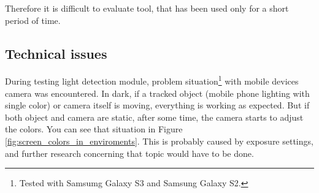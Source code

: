Therefore it is difficult to evaluate tool, that has been used only for a short period of time.

\subsection{Technical issues}
During testing light detection module, problem situation\footnote{Tested with Samsumg Galaxy S3 and Samsung Galaxy S2.} with mobile devices camera was encountered.
In dark, if a tracked object (mobile phone lighting with single color) or camera itself is moving, everything is working as expected.
But if both object and camera are static, after some time, the camera starts to adjust the colors.
You can see that situation in Figure \ref{fig:screen_colors_in_enviroments}.
This is probably caused by exposure settings, and further research concerning that topic would have to be done.
